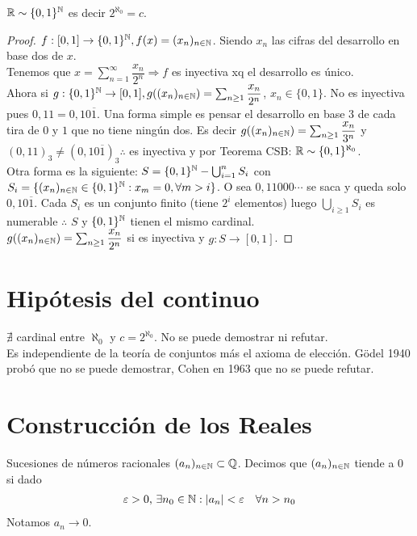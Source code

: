 \begin{theorem}
  \(\mathbb{R} \sim \{ 0, 1 \}^{\mathbb{N}}\) es decir \(2^{\aleph_0} = c\).
  \begin{proof}
    \(f: [0, 1] \to \{ 0, 1 \}^{\mathbb{N}}, f(x) = (x_n)_{n \in \mathbb{N}}\). Siendo \(x_n\) las cifras del desarrollo en base dos de \(x\). \\
    Tenemos que \(x = \sum_{n=1}^\infty \dfrac{x_n}{2^n} \Rightarrow f\) es inyectiva xq el desarrollo es único. \\
    Ahora si \(g: \{ 0, 1 \}^{\mathbb{N}} \to [0, 1], g((x_n)_{n \in \mathbb{N}}) = \sum_{n \geq 1} \dfrac{x_n}{2^n}\), \(x_n \in \{0, 1\}\). No es inyectiva pues \(0,11 = 0,10\overline{1}\).
    Una forma simple es pensar el desarrollo en base \(3\) de cada tira de \(0\) y \(1\) que no tiene ningún dos. Es decir \(g((x_n)_{n \in \mathbb{N}}) = \sum_{n \geq 1} \dfrac{x_n}{3^n}\) y \((0,11)_3 \neq (0,10\overline{1})_3 \therefore\)
    es inyectiva y por Teorema CSB: \(\mathbb{R} \sim \{0,1\}^{\aleph_0}\). \\
    Otra forma es la siguiente:
    \(S = \{0, 1\}^{\mathbb{N}} - \bigcup_{i=1}^n S_i\) con \(S_i = \{ (x_n)_{n \in \mathbb{N}} \in \{0, 1\}^{\mathbb{N}} : x_m = 0, \forall m > i \}\). O sea \(0,11000\cdots\) se saca y queda solo \(0,10\overline{1}\).
    Cada \(S_i\) es un conjunto finito (tiene \(2^i\) elementos) luego \(\bigcup_{i \geq 1} S_i\) es numerable \(\therefore\) \(S\) y \(\{0,1\}^{\mathbb{N}}\) tienen el mismo cardinal. \\
    \(g((x_n)_{n \in \mathbb{N}}) = \sum_{n \geq 1} \dfrac{x_n}{2^n}\) si es inyectiva y \(g: S \to [0, 1]\).
  \end{proof}
\end{theorem}

\section{Hipótesis del continuo}

\(\nexists\) cardinal entre \(\aleph_0\) y \(c = 2^{\aleph_0}\). No se puede demostrar ni refutar. \\
Es independiente de la teoría de conjuntos más el axioma de elección.
Gödel 1940 probó que no se puede demostrar, Cohen en 1963 que no se puede refutar.

\section{Construcción de los Reales}

Sucesiones de números racionales \((a_n)_{n \in \mathbb{N}} \subset \mathbb{Q}\). Decimos que \((a_n)_{n \in \mathbb{N}}\) tiende a 0 si dado \begin{align*}
  \varepsilon > 0\text{, } \exists n_0 \in \mathbb{N} : |a_n| < \varepsilon \quad \forall n > n_0
\end{align*} Notamos \(a_n \to 0\).

